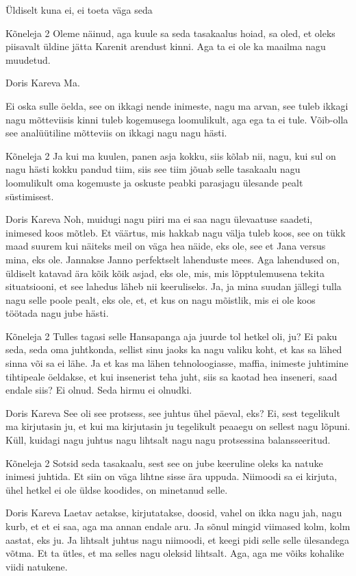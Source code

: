 Üldiselt kuna ei, ei toeta väga seda 

Kõneleja 2
Oleme näinud, aga kuule sa seda tasakaalus hoiad, sa oled, et oleks piisavalt üldine jätta Karenit arendust kinni. Aga ta ei ole ka maailma nagu muudetud. 

Doris Kareva
Ma. 

Ei oska sulle öelda, see on ikkagi nende inimeste, nagu ma arvan, see tuleb ikkagi nagu mõtteviisis kinni tuleb kogemusega loomulikult, aga ega ta ei tule. Võib-olla see analüütiline mõtteviis on ikkagi nagu nagu hästi. 

Kõneleja 2
Ja kui ma kuulen, panen asja kokku, siis kõlab nii, nagu, kui sul on nagu hästi kokku pandud tiim, siis see tiim jõuab selle tasakaalu nagu loomulikult oma kogemuste ja oskuste peabki parasjagu ülesande pealt süstimisest. 

Doris Kareva
Noh, muidugi nagu piiri ma ei saa nagu ülevaatuse saadeti, inimesed koos mõtleb. Et väärtus, mis hakkab nagu välja tuleb koos, see on tükk maad suurem kui näiteks meil on väga hea näide, eks ole, see et Jana versus mina, eks ole. Jannakse Janno perfektselt lahenduste mees. Aga lahendused on, üldiselt katavad ära kõik kõik asjad, eks ole, mis, mis lõpptulemusena tekita situatsiooni, et see lahedus läheb nii keeruliseks. Ja, ja mina suudan jällegi tulla nagu selle poole pealt, eks ole, et, et kus on nagu mõistlik, mis ei ole koos töötada nagu jube hästi. 

Kõneleja 2
Tulles tagasi selle Hansapanga aja juurde tol hetkel oli, ju? Ei paku seda, seda oma juhtkonda, sellist sinu jaoks ka nagu valiku koht, et kas sa lähed sinna või sa ei lähe. Ja et kas ma lähen tehnoloogiasse, maffia, inimeste juhtimine tihtipeale öeldakse, et kui insenerist teha juht, siis sa kaotad hea inseneri, saad endale siis? Ei olnud. Seda hirmu ei olnudki. 

Doris Kareva
See oli see protsess, see juhtus ühel päeval, eks? Ei, sest tegelikult ma kirjutasin ju, et kui ma kirjutasin ju tegelikult peaaegu on sellest nagu lõpuni. Küll, kuidagi nagu juhtus nagu lihtsalt nagu nagu protsessina balansseeritud. 

Kõneleja 2
Sotsid seda tasakaalu, sest see on jube keeruline oleks ka natuke inimesi juhtida. Et siin on väga lihtne sisse ära uppuda. Niimoodi sa ei kirjuta, ühel hetkel ei ole üldse koodides, on minetanud selle. 

Doris Kareva
Laetav aetakse, kirjutatakse, doosid, vahel on ikka nagu jah, nagu kurb, et et ei saa, aga ma annan endale aru. Ja sõnul mingid viimased kolm, kolm aastat, eks ju. Ja lihtsalt juhtus nagu niimoodi, et keegi pidi selle selle ülesandega võtma. Et ta ütles, et ma selles nagu oleksid lihtsalt. Aga, aga me võiks kohalike viidi natukene. 

